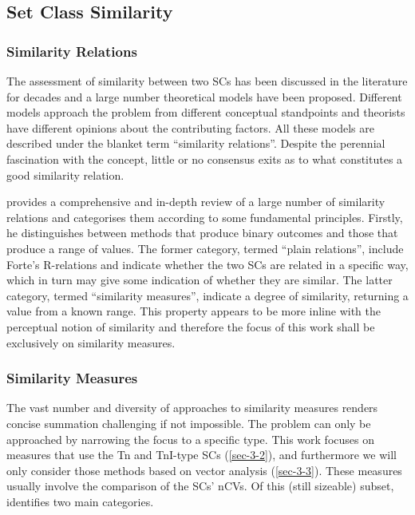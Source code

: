 \documentclass{article}
\begin{document}
\subsection{Set Class Similarity}
\label{sec-3-4}
\subsubsection{Similarity Relations}
\label{sec-3-4-1}

The assessment of similarity between two SCs has been discussed in the
literature for decades and a large number theoretical models have been
proposed. Different models approach the problem from different
conceptual standpoints and theorists have different opinions about the
contributing factors. All these models are described under the blanket
term ``similarity relations''. Despite the perennial fascination with
the concept, little or no consensus exits as to what constitutes a
good similarity relation.

\citet{Castren1994} provides a comprehensive and in-depth review of a
large number of similarity relations and categorises them according to
some fundamental principles. Firstly, he distinguishes between methods
that produce binary outcomes and those that produce a range of
values. The former category, termed ``plain relations'', include Forte's
R-relations \citep{Forte1973} and indicate whether the two SCs are
related in a specific way, which in turn may give some indication of
whether they are similar. The latter category, termed ``similarity
measures'', indicate a degree of similarity, returning a value from a
known range. This property appears to be more inline with the
perceptual notion of similarity and therefore the focus of this work
shall be exclusively on similarity measures.
\subsubsection{Similarity Measures}
\label{sec-3-4-2}

The vast number and diversity of approaches to similarity measures
renders concise summation challenging if not impossible. The problem
can only be approached by narrowing the focus to a specific type. This
work focuses on measures that use the Tn and TnI-type SCs (\ref{sec-3-2}), and furthermore we will only consider those methods
based on vector analysis (\ref{sec-3-3}). These measures usually
involve the comparison of the SCs' nCVs. Of this (still sizeable)
subset, \citet{Castren1994} identifies two main categories.
\end{document}
